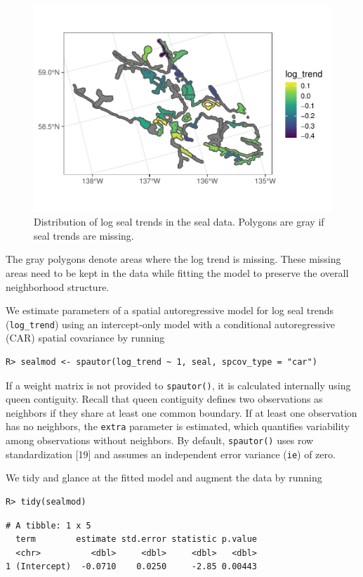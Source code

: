 \documentclass[10pt,letterpaper]{article}
\begin{document}
\begin{figure}

{\centering \includegraphics[width=0.65\linewidth]{preprint_old_files/figure-latex/log_trend-1} 

}

\caption{Distribution of log seal trends in the seal data. Polygons are gray if seal trends are missing.}\label{fig:log_trend}
\end{figure}

The gray polygons denote areas where the log trend is missing. These
missing areas need to be kept in the data while fitting the model to
preserve the overall neighborhood structure.

We estimate parameters of a spatial autoregressive model for log seal
trends (\texttt{log\_trend}) using an intercept-only model with a
conditional autoregressive (CAR) spatial covariance by running

\begin{verbatim}
R> sealmod <- spautor(log_trend ~ 1, seal, spcov_type = "car")
\end{verbatim}

If a weight matrix is not provided to \texttt{spautor()}, it is
calculated internally using queen contiguity. Recall that queen
contiguity defines two observations as neighbors if they share at least
one common boundary. If at least one observation has no neighbors, the
\texttt{extra} parameter is estimated, which quantifies variability
among observations without neighbors. By default, \texttt{spautor()}
uses row standardization {[}19{]} and assumes an independent error
variance (\texttt{ie}) of zero.

We tidy and glance at the fitted model and augment the data by running

\begin{verbatim}
R> tidy(sealmod)
\end{verbatim}

\begin{verbatim}
# A tibble: 1 x 5
  term        estimate std.error statistic p.value
  <chr>          <dbl>     <dbl>     <dbl>   <dbl>
1 (Intercept)  -0.0710    0.0250     -2.85 0.00443
\end{verbatim}
\end{document}
